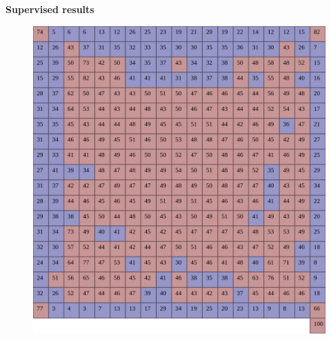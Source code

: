 \documentclass[xcolor=dvipsnames]{beamer}
\begin{document}
\begin{frame}{\bf Supervised results}

\begin{figure}[!htb]
  \centering
  \includegraphics[scale=0.12]{../../pictures/moves_success_rate_testing_top5.png}
\end{figure}


\end{frame}
\end{document}
